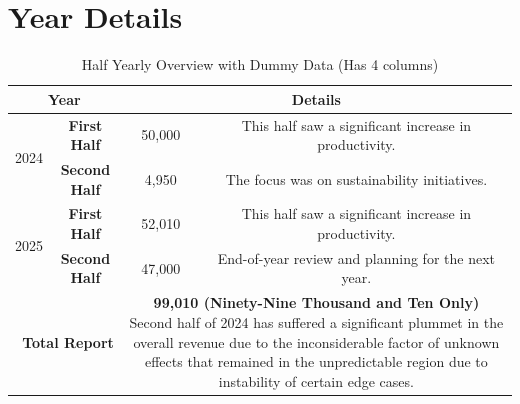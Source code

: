 \documentclass[a4paper,11pt]{article}
\begin{document}
	\section{Year Details}

	\begin{table}[htbp]
		\centering
		\begin{tabular}{| *{4}{ c| }}
			\hline
			\multicolumn{2}{|c|}{\textbf{Year}} & \multicolumn{2}{|c|}{\textbf{Details}} \\
			\hline
			\multirow{2}{*}{2024} & \textbf{First Half} & 50,000 &
			This half saw a significant increase in productivity. \\
			
			\cline{2-4}
				\multirow{2}{*}{} & \textbf{Second Half} & 4,950 &
			The focus was on sustainability initiatives. \\
			
			\hline
				\multirow{2}{*}{2025} & \textbf{First Half} &  52,010 &
			This half saw a significant increase in productivity. \\
			
			\cline{2-4}
				\multirow{2}{*}{} & \textbf{Second Half} & 47,000 &
		End-of-year review and planning for the next year. \\
			\hline
			
			\multicolumn{2}{|r|}{\multirow{6}{*}{\textbf{Total Report}}} & \multicolumn{2}{|c|}{\multirow{6}{*}{
				\parbox{10cm}{
					\textbf{99,010 (Ninety-Nine Thousand and Ten Only)} \\ Second half of 2024 has suffered a significant plummet in the overall revenue due to the inconsiderable factor of unknown effects that remained in the unpredictable region due to instability of certain edge cases.
				}	
		}} \\ 			
			\multicolumn{2}{|r|}{} & \multicolumn{2}{|c|}{} \\
			\multicolumn{2}{|r|}{} & \multicolumn{2}{|c|}{} \\
			\multicolumn{2}{|r|}{} & \multicolumn{2}{|c|}{} \\
			\multicolumn{2}{|r|}{} & \multicolumn{2}{|c|}{} \\
			\multicolumn{2}{|r|}{} & \multicolumn{2}{|c|}{} \\

			\hline
		\end{tabular}
		\caption{Half Yearly Overview with Dummy Data (Has 4 columns)}
		\label{tab:overview}
	\end{table}

	
\end{document}
